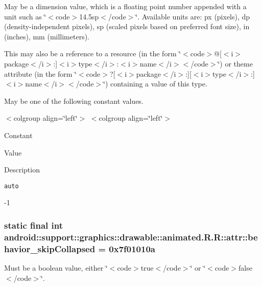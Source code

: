 May be a dimension value, which is a floating point number appended with a unit such as \char`\"{}$<$code$>$14.5sp$<$/code$>$\char`\"{}. Available units are: px (pixels), dp (density-independent pixels), sp (scaled pixels based on preferred font size), in (inches), mm (millimeters). 

This may also be a reference to a resource (in the form \char`\"{}$<$code$>$@\mbox{[}$<$i$>$package$<$/i$>$:\mbox{]}$<$i$>$type$<$/i$>$:$<$i$>$name$<$/i$>$$<$/code$>$\char`\"{}) or theme attribute (in the form \char`\"{}$<$code$>$?\mbox{[}$<$i$>$package$<$/i$>$:\mbox{]}\mbox{[}$<$i$>$type$<$/i$>$:\mbox{]}$<$i$>$name$<$/i$>$$<$/code$>$\char`\"{}) containing a value of this type. 

May be one of the following constant values. \begin{TabularC}{0}
\hline
\end{TabularC}
$<$colgroup align=\char`\"{}left\char`\"{}$>$ $<$colgroup align=\char`\"{}left\char`\"{}$>$ 

Constant

Value

Description 

{\tt auto}

-1\hypertarget{classandroid_1_1support_1_1graphics_1_1drawable_1_1animated_1_1_r_1_1attr_29c1ea3fea3689f2e707ba8708bc8915}{
\subsubsection[{behavior\_\-skipCollapsed}]{\setlength{\rightskip}{0pt plus 5cm}static final int android::support::graphics::drawable::animated.R.R::attr::behavior\_\-skipCollapsed = 0x7f01010a}}
\label{classandroid_1_1support_1_1graphics_1_1drawable_1_1animated_1_1_r_1_1attr_29c1ea3fea3689f2e707ba8708bc8915}


Must be a boolean value, either \char`\"{}$<$code$>$true$<$/code$>$\char`\"{} or \char`\"{}$<$code$>$false$<$/code$>$\char`\"{}. 

